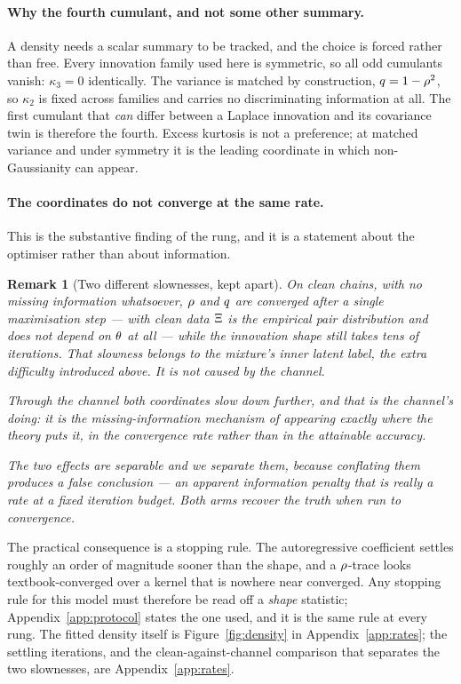 \documentclass{article}
\newtheorem{remark}{Remark}
\begin{document}
\paragraph{Why the fourth cumulant, and not some other summary.} A density needs a scalar summary
to be tracked, and the choice is forced rather than free. Every innovation family used here is
symmetric, so all odd cumulants vanish: $\kappa_3=0$ identically. The variance is matched by
construction, $q=1-\rho^2$, so $\kappa_2$ is fixed across families and carries no
discriminating information at all. The first cumulant that \emph{can} differ between a Laplace
innovation and its covariance twin is therefore the fourth. Excess kurtosis is not a preference;
at matched variance and under symmetry it is the leading coordinate in which non-Gaussianity can
appear.

\paragraph{The coordinates do not converge at the same rate.} This is the substantive finding of
the rung, and it is a statement about the optimiser rather than about information.

\begin{remark}[Two different slownesses, kept apart]
\label{rem:rates}
On \emph{clean} chains, with no missing information whatsoever, $\rho$ and $q$ are converged
after a single maximisation step --- with clean data $\Xi$ is the empirical pair distribution and
does not depend on $\theta$ at all --- while the innovation shape still takes tens of iterations.
That slowness belongs to the mixture's inner latent label, the extra difficulty introduced above. It is not caused by the channel.

Through the channel both coordinates slow down further, and \emph{that} is the channel's doing:
it is the missing-information mechanism of \citet{dempster1977} appearing exactly where the theory
puts it, in the convergence rate rather than in the attainable accuracy.

The two effects are separable and we separate them, because conflating them produces a false
conclusion --- an apparent \emph{information} penalty that is really a rate at a fixed iteration
budget. Both arms recover the truth when run to convergence.
\end{remark}

\noindent
The practical consequence is a stopping rule. The autoregressive coefficient settles roughly an
order of magnitude sooner than the shape, and a $\rho$-trace looks textbook-converged over a
kernel that is nowhere near converged. Any stopping rule for this model must therefore be read off
a \emph{shape} statistic; Appendix~\ref{app:protocol} states the one used, and it is the same rule at
every rung. The fitted density itself is Figure~\ref{fig:density} in Appendix~\ref{app:rates}; the settling iterations, and
the clean-against-channel comparison that separates the two slownesses, are
Appendix~\ref{app:rates}.
\end{document}
